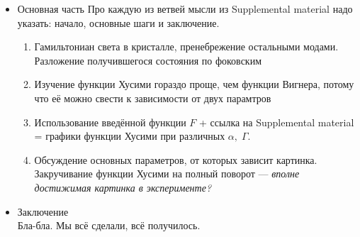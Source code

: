 \documentclass[a4paper, 12pt]{article}
\begin{document}
\begin{itemize}
    \item Основная часть
    Про каждую из ветвей мысли из Supplemental material надо указать: начало, основные шаги и заключение.
    \begin{enumerate}
        \item Гамильтониан света в кристалле, пренебрежение остальными модами. Разложение получившегося состояния по фоковским
        \item Изучение функции Хусими гораздо проще, чем функции Вигнера, потому что её можно свести к зависимости от двух парамтров
        \item Использование введённой функции $F$ + ссылка на Supplemental material = графики функции Хусими при различных $\alpha, \; \Gamma$.
        \item Обсуждение основных параметров, от которых зависит картинка. Закручивание функции Хусими на полный поворот --- \textit{вполне достижимая картинка в эксперименте?}
    \end{enumerate}
    \item Заключение\\
    Бла-бла. Мы всё сделали, всё получилось.
\end{itemize}
\end{document}

